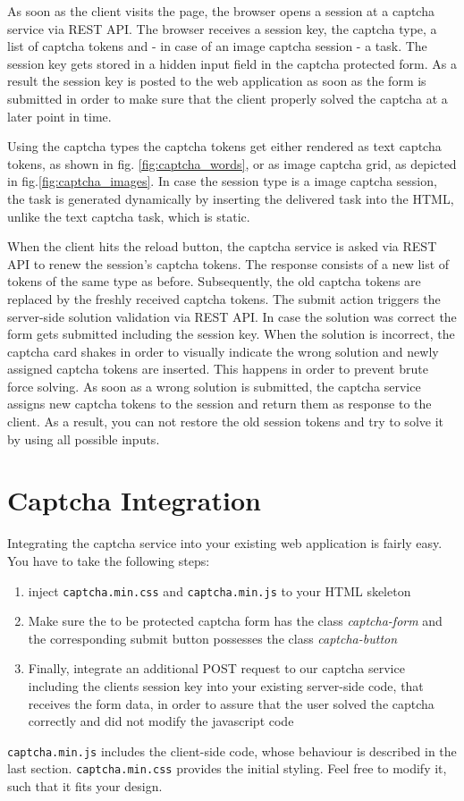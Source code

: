  As soon as the client visits the page, the browser opens a session at a captcha service via REST API. The browser receives a session key, the captcha type, a list of captcha tokens and - in case of an image captcha session - a task. The session key gets stored in a hidden input field in the captcha protected form. As a result the session key is posted to the web application as soon as the form is submitted in order to make sure that the client properly solved the captcha at a later point in time. 
 
 Using the captcha types the captcha tokens get either rendered as text captcha tokens, as shown in fig. \ref{fig:captcha_words}, or as image captcha grid, as depicted in fig.\ref{fig:captcha_images}. In case the session type is a image captcha session, the task is generated dynamically by inserting the delivered task into the HTML, unlike the text captcha task, which is static.
 
 When the client hits the reload button, the captcha service is asked via REST API to renew the session's captcha tokens. The response consists of a new list of tokens of the same type as before. Subsequently, the old captcha tokens are replaced by the freshly received captcha tokens. The submit action triggers the server-side solution validation via REST API. In case the solution was correct the form gets submitted including the session key. When the solution is incorrect, the captcha card shakes in order to visually indicate the wrong solution and newly assigned captcha tokens are inserted. This happens in order to prevent brute force solving. As soon as a wrong solution is submitted, the captcha service assigns new captcha tokens to the session and return them as response to the client. As a result, you can not restore the old session tokens and try to solve it by using all possible inputs.

\section{Captcha Integration}
\label{sec:Captcha Integration}

Integrating the captcha service into your existing web application is fairly easy. You have to take the following steps:
\begin{enumerate}
	\item inject \texttt{captcha.min.css} and \texttt{captcha.min.js} to your HTML skeleton
	\item  Make sure the to be protected captcha form has the class \textit{captcha-form} and the corresponding submit button possesses the class \textit{captcha-button}
	\item Finally, integrate an additional POST request to our captcha service including the clients session key into your existing server-side code, that receives the form data, in order to assure that the user solved the captcha correctly and did not modify the javascript code
\end{enumerate}

\texttt{captcha.min.js} includes the client-side code, whose behaviour is described in the last section. \texttt{captcha.min.css} provides the initial styling. Feel free to modify it, such that it fits your design.

\clearpage
